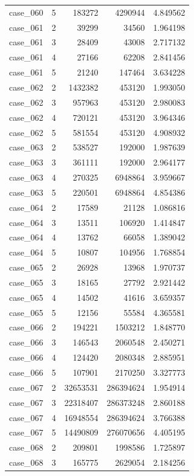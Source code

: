 \begin{longtable}{lrrrr}
case\_060 & 5 & 183272 & 4290944 & 4.849562 \\
case\_061 & 2 & 39299 & 34560 & 1.964198 \\
case\_061 & 3 & 28409 & 43008 & 2.717132 \\
case\_061 & 4 & 27166 & 62208 & 2.841456 \\
case\_061 & 5 & 21240 & 147464 & 3.634228 \\
case\_062 & 2 & 1432382 & 453120 & 1.993050 \\
case\_062 & 3 & 957963 & 453120 & 2.980083 \\
case\_062 & 4 & 720121 & 453120 & 3.964346 \\
case\_062 & 5 & 581554 & 453120 & 4.908932 \\
case\_063 & 2 & 538527 & 192000 & 1.987639 \\
case\_063 & 3 & 361111 & 192000 & 2.964177 \\
case\_063 & 4 & 270325 & 6948864 & 3.959667 \\
case\_063 & 5 & 220501 & 6948864 & 4.854386 \\
case\_064 & 2 & 17589 & 21128 & 1.086816 \\
case\_064 & 3 & 13511 & 106920 & 1.414847 \\
case\_064 & 4 & 13762 & 66058 & 1.389042 \\
case\_064 & 5 & 10807 & 104956 & 1.768854 \\
case\_065 & 2 & 26928 & 13968 & 1.970737 \\
case\_065 & 3 & 18165 & 27792 & 2.921442 \\
case\_065 & 4 & 14502 & 41616 & 3.659357 \\
case\_065 & 5 & 12156 & 55584 & 4.365581 \\
case\_066 & 2 & 194221 & 1503212 & 1.848770 \\
case\_066 & 3 & 146543 & 2060548 & 2.450271 \\
case\_066 & 4 & 124420 & 2080348 & 2.885951 \\
case\_066 & 5 & 107901 & 2170250 & 3.327773 \\
case\_067 & 2 & 32653531 & 286394624 & 1.954914 \\
case\_067 & 3 & 22318407 & 286373248 & 2.860188 \\
case\_067 & 4 & 16948554 & 286394624 & 3.766388 \\
case\_067 & 5 & 14490809 & 276070656 & 4.405195 \\
case\_068 & 2 & 209801 & 1998586 & 1.725897 \\
case\_068 & 3 & 165775 & 2629054 & 2.184256 \\

\end{longtable}
